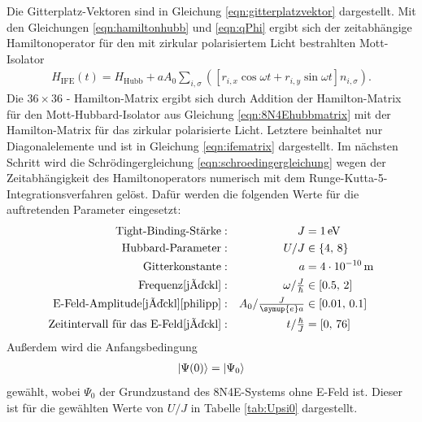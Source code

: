 Die Gitterplatz-Vektoren sind in Gleichung \eqref{eqn:gitterplatzvektor} dargestellt. Mit den Gleichungen \eqref{eqn:hamiltonhubb} und \eqref{eqn:qPhi}
ergibt sich der zeitabhängige Hamiltonoperator für den mit zirkular polarisiertem Licht bestrahlten Mott-Isolator
\begin{align}
  H_\text{IFE}(t) = H_\text{Hubb} + a A_0 \sum_{i,\sigma} \left(\left[r_{i,x} \cos{\omega t} + r_{i,y} \sin{\omega t} \right] n_{i,\sigma}\right).
\end{align}
Die $36 \times 36$ - Hamilton-Matrix ergibt sich durch Addition der Hamilton-Matrix für den Mott-Hubbard-Isolator aus Gleichung \eqref{eqn:8N4Ehubbmatrix} mit der Hamilton-Matrix
für das zirkular polarisierte Licht. Letztere beinhaltet nur Diagonalelemente und ist in Gleichung \eqref{eqn:ifematrix} dargestellt.
Im nächsten Schritt wird die Schrödingergleichung \eqref{eqn:schroedingergleichung} wegen der Zeitabhängigkeit des Hamiltonoperators numerisch mit dem Runge-Kutta-5-Integrationsverfahren
gelöst. Dafür werden die folgenden Werte für die auftretenden Parameter eingesetzt:
\begin{align*}
  \text{Tight-Binding-Stärke}&: &J & = \SI{1}{\electronvolt} \\
  \text{Hubbard-Parameter}&: &U/J & \in \{ 4, \, 8 \} \\
  \text{Gitterkonstante}&: &a & = \SI{4e-10}{\meter} \\
  \text{Frequenz\cite{jäckl}}&: &\omega /\tfrac{J}{\hbar} & \in [0.5 , \, 2] \\
  \text{E-Feld-Amplitude\cite{jäckl}\cite{philipp}}&: &A_0 /\tfrac{J}{\symup{e}a} & \in [0.01 , \, 0.1] \\
  \text{Zeitintervall für das E-Feld\cite{jäckl}}&: &t /\tfrac{\hbar}{J} & = [0, \,76]
\end{align*}
Außerdem wird die Anfangsbedingung
\begin{align}
  \ket{\Psi(0)} = \ket{\Psi_0}
  \label{eqn:anfangsbedingung}
\end{align}
gewählt, wobei $\Psi_0$ der Grundzustand des 8N4E-Systems ohne E-Feld ist. Dieser ist für die gewählten Werte von $U/J$
in Tabelle \ref{tab:Upsi0} dargestellt.

